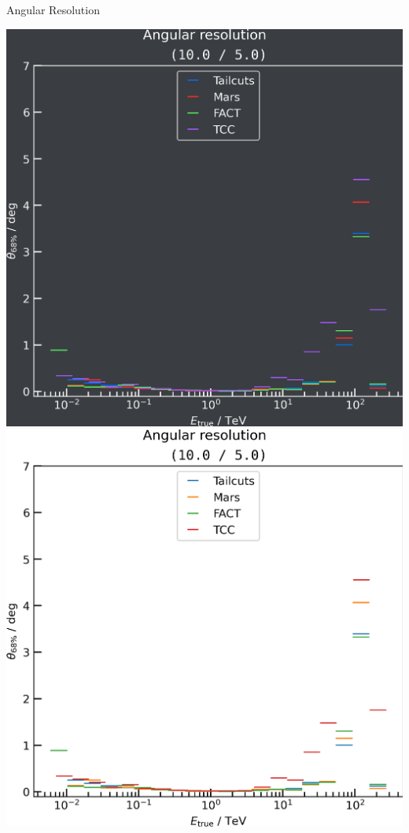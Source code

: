 \begin{frame}[label=ang_res]{Angular Resolution}
\begin{minipage}{0.32\textwidth}
    \fi
  \end{minipage}
  \begin{minipage}{0.32\textwidth}
    \ifdefined\darktheme
      \centering
      \includegraphics[width=\textwidth]{plots/ang_res/ang_res_10.0_5.0_dark.png}
    \else
      \centering
      \includegraphics[width=\textwidth]{plots/ang_res/ang_res_10.0_5.0_light.png}
    \fi
  \end{minipage}
\end{frame}

